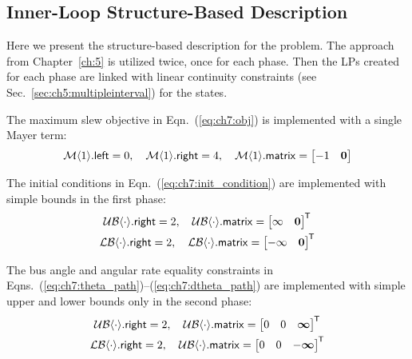 \subsection{Inner-Loop Structure-Based Description}

Here we present the structure-based description for the \lqdo{} problem.
The approach from Chapter~\ref{ch:5} is utilized twice, once for each phase.
Then the LPs created for each phase are linked with linear continuity constraints (see Sec.~\ref{sec:ch5:multipleinterval}) for the states.

The maximum slew objective in Eqn.~(\ref{eq:ch7:obj}) is implemented with a single Mayer term:%
\begin{gather}
\mathcal{M}\langle{1}\rangle.\textup{\textsf{left}} = 0, \quad \mathcal{M}\langle{1}\rangle.\textup{\textsf{right}} = 4, \quad \mathcal{M}\langle{1}\rangle.\textup{\textsf{matrix}} = \begin{bmatrix}-1 & \bm{0} \end{bmatrix} 
\end{gather}

\noindent The initial conditions in Eqn.~(\ref{eq:ch7:init_condition}) are implemented with simple bounds in the first phase:%
\begin{subequations}%
\begin{gather}%
\mathcal{UB}\xind{\cdot}.\xvar{right} = 2, \quad \mathcal{UB}\xind{\cdot}.\xvar{matrix} = \begin{bmatrix} \infty & \bm{0} \end{bmatrix}\tran \\
\mathcal{LB}\xind{\cdot}.\xvar{right} = 2, \quad \mathcal{LB}\xind{\cdot}.\xvar{matrix} = \begin{bmatrix} -\infty & \bm{0} \end{bmatrix}\tran
\end{gather}
\end{subequations}

\noindent The bus angle and angular rate equality constraints in Eqns.~(\ref{eq:ch7:theta_path})--(\ref{eq:ch7:dtheta_path}) are implemented with simple upper and lower bounds only in the second phase:%
\begin{subequations}%
\begin{gather}%
\mathcal{UB}\xind{\cdot}.\xvar{right} = 2, \quad \mathcal{UB}\xind{\cdot}.\xvar{matrix} = \begin{bmatrix} 0 & 0 & \bm{\infty} \end{bmatrix}\tran \\
\mathcal{LB}\xind{\cdot}.\xvar{right} = 2, \quad \mathcal{UB}\xind{\cdot}.\xvar{matrix} = \begin{bmatrix} 0 & 0 & -\bm{\infty} \end{bmatrix}\tran
\end{gather}
\end{subequations}

